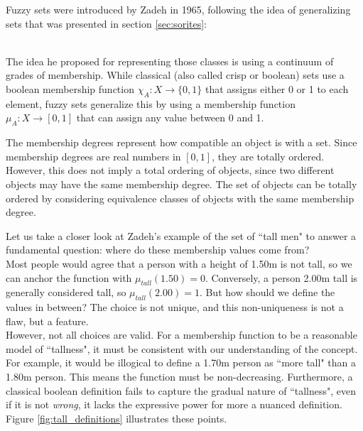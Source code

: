 Fuzzy sets were introduced by Zadeh in 1965, following the idea of generalizing sets that was presented in section \ref{sec:sorites}:

\cite{Zadeh1965}\\

The idea he proposed for representing those classes is using a continuum of grades of membership. While classical (also called crisp or boolean) sets use a boolean membership function $\chi_A:X\rightarrow\{0,1\}$ that assigns either 0 or 1 to each element, fuzzy sets generalize this by using a membership function $\mu_A:X\rightarrow[0,1]$ that can assign any value between 0 and 1. 

\begin{remark}
    The membership degrees represent how compatible an object is with a set. Since membership degrees are real numbers in $[0,1]$, they are totally ordered. However, this does not imply a total ordering of objects, since two different objects may have the same membership degree. The set of objects can be totally ordered by considering equivalence classes of objects with the same membership degree.
\end{remark}

Let us take a closer look at Zadeh's example of the set of ``tall men" to answer a fundamental question: where do these membership values come from?\\

Most people would agree that a person with a height of 1.50m is not tall, so we can anchor the function with $\mu_{tall}(1.50) = 0$. Conversely, a person 2.00m tall is generally considered tall, so $\mu_{tall}(2.00) = 1$. But how should we define the values in between? The choice is not unique, and this non-uniqueness is not a flaw, but a feature.\\

However, not all choices are valid. For a membership function to be a reasonable model of ``tallness", it must be consistent with our understanding of the concept. For example, it would be illogical to define a 1.70m person as ``more tall" than a 1.80m person. This means the function must be non-decreasing. Furthermore, a classical boolean definition fails to capture the gradual nature of ``tallness", even if it is not \emph{wrong}, it lacks the expressive power for more a nuanced definition. Figure \ref{fig:tall_definitions} illustrates these points.

